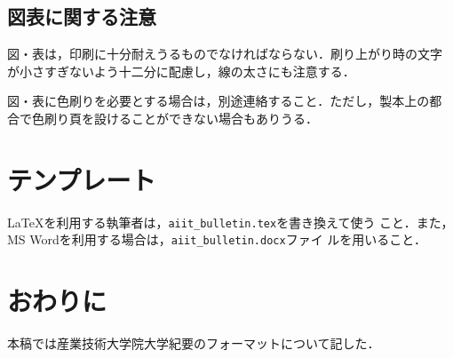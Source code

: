 \documentclass[a4j, 12Q, twocolumn, twoside]{jsarticle}
\begin{document}
\subsection{図表に関する注意}
図・表は，印刷に十分耐えうるものでなければならない．刷り上がり時の文字
が小さすぎないよう十二分に配慮し，線の太さにも注意する．

図・表に色刷りを必要とする場合は，別途連絡すること．ただし，製本上の都
合で色刷り頁を設けることができない場合もありうる．

\section{テンプレート}
\LaTeX を利用する執筆者は，\texttt{aiit\_bulletin.tex}を書き換えて使う
こと．また，MS Wordを利用する場合は，\texttt{aiit\_bulletin.docx}ファイ
ルを用いること．

\section{おわりに}
本稿では産業技術大学院大学紀要のフォーマットについて記した．



\end{document}

